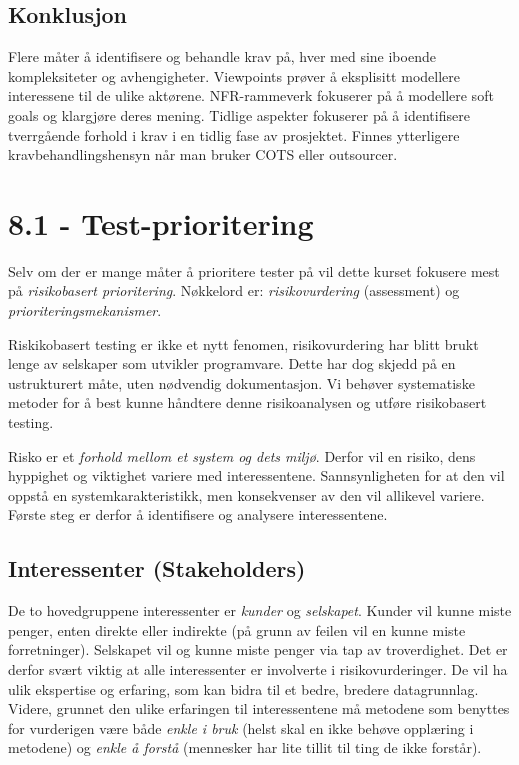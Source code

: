 \subsection{Konklusjon}

Flere måter å identifisere og behandle krav på, hver med sine iboende
kompleksiteter og avhengigheter. Viewpoints prøver å eksplisitt
modellere interessene til de ulike aktørene. NFR-rammeverk fokuserer på
å modellere soft goals og klargjøre deres mening. Tidlige aspekter
fokuserer på å identifisere tverrgående forhold i krav i en tidlig fase
av prosjektet. Finnes ytterligere kravbehandlingshensyn når man bruker
COTS eller outsourcer.

\section{8.1 - Test-prioritering}

Selv om der er mange måter å prioritere tester på vil dette kurset
fokusere mest på \emph{risikobasert prioritering}. Nøkkelord er:
\emph{risikovurdering} (assessment) og \emph{prioriteringsmekanismer}.

Riskikobasert testing er ikke et nytt fenomen, risikovurdering har blitt
brukt lenge av selskaper som utvikler programvare. Dette har dog skjedd
på en ustrukturert måte, uten nødvendig dokumentasjon. Vi behøver
systematiske metoder for å best kunne håndtere denne risikoanalysen og
utføre risikobasert testing.

Risko er et \emph{forhold mellom et system og dets miljø}. Derfor vil en
risiko, dens hyppighet og viktighet variere med interessentene.
Sannsynligheten for at den vil oppstå en systemkarakteristikk, men
konsekvenser av den vil allikevel variere. Første steg er derfor å
identifisere og analysere interessentene.

\subsection{Interessenter (Stakeholders)}

De to hovedgruppene interessenter er \emph{kunder} og \emph{selskapet}.
Kunder vil kunne miste penger, enten direkte eller indirekte (på grunn
av feilen vil en kunne miste forretninger). Selskapet vil og kunne miste
penger via tap av troverdighet. Det er derfor svært viktig at alle
interessenter er involverte i risikovurderinger. De vil ha ulik
ekspertise og erfaring, som kan bidra til et bedre, bredere
datagrunnlag. Videre, grunnet den ulike erfaringen til interessentene må
metodene som benyttes for vurderigen være både \emph{enkle i bruk}
(helst skal en ikke behøve opplæring i metodene) og \emph{enkle å
forstå} (mennesker har lite tillit til ting de ikke forstår).

